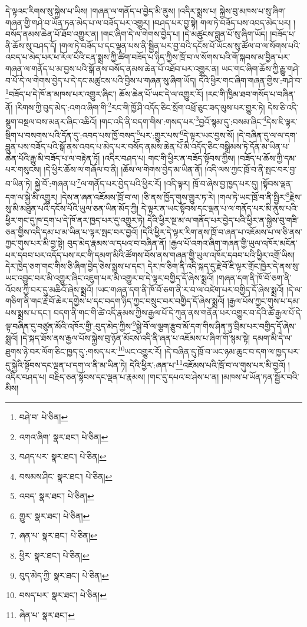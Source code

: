 དེ་ལྟའང་རིགས་སུ་སྐྱེས་པ་ཡིས། །གཞན་ལ་གནོད་པ་བྱེད་མི་ནུས། །འདིར་སྨྲས་པ། སྐྱེས་བུ་མཁས་པ་སུ་ཞིག་གཞན་གྱི་གཤེ་བ་ཡོན་ཏན་མེད་པ་ལ་བཟོད་པར་འགྱུར། །བཤད་པར་བྱ་སྟེ། གལ་ཏེ་བཟོད་པས་འབད་མེད་པར། །བསོད་ནམས་ཆེན་པོ་ཐོབ་འགྱུར་ན། །གང་ཞིག་དེ་ལ་གེགས་བྱེད་པ། །དེ་མཚུངས་བླུན་པོ་སུ་ཞིག་ཡོད། །བཟོད་པ་ནི་ཆོས་སུ་བཤད་དོ། །གལ་ཏེ་བཟོད་པ་དང་ལྡན་པས་ནི་སྦྱིན་པར་བྱ་བའི་དངོས་པོ་ཡོངས་སུ་ཚོལ་བ་ལ་སོགས་པའི་འབད་པ་མེད་པར་ཕ་རོལ་པོའི་ངན་སྨྲས་ཀྱི་ཚིག་བཟོད་པ་ཉིད་ཀྱིས་ཁྲོ་བ་ལ་སོགས་པའི་གོ་སྐབས་མ་བྱིན་པར་གཞན་ལ་གནོད་པ་མ་བྱས་པའི་སྒོ་ནས་བསོད་ནམས་ཆེན་པོ་འཐོབ་པར་འགྱུར་ན། ཡང་གང་ཞིག་ཆོས་ཀྱི་རྒྱུ་གཤེ་བ་པོ་དེ་ལ་གེགས་བྱེད་པ་དེ་དང་མཚུངས་པའི་བྱིས་པ་གཞན་སུ་ཞིག་ཡོད། དེའི་ཕྱིར་གང་ཞིག་གཞན་གྱིས་:གཤེ་བ་\footnote{བཤེ་བ་  པེ་ཅིན། }བཟོད་པ་དེ་ཁོ་ན་མཁས་པར་འགྱུར་ཞིང་། ཆོས་ཆེན་པོ་ཡང་དེ་ལ་འགྱུར་རོ། །རང་གི་ཁྱིམ་ཐབ་གསོད་པ་བཞིན་ནོ། །རིགས་ཀྱི་བུད་མེད་:འགའ་ཞིག་གི་\footnote{འགའ་ཞིག་  སྣར་ཐང་།  པེ་ཅིན། }རང་གི་ཁྱོ་ཤི་འདོད་ཅིང་སྲོག་འཕྲོ་ཅུང་ཟད་ལུས་པར་གྱུར་ཏེ། དེས་ཅི་འདི་སྡུག་བསྔལ་བས་མནར་ཞིང་འཆིའོ། །གང་འདི་ནི་བདག་གིས་:གསད་པར་\footnote{བཤད་པར་  སྣར་ཐང་།  པེ་ཅིན། }བྱའོ་སྙམ་དུ་:བསམ་ཞིང་\footnote{བསམས་ཤིང་  སྣར་ཐང་།  པེ་ཅིན། }དེས་ཇི་ལྟར་སྡིག་པ་བསགས་པའི་དོན་དུ་:འབད་པས་ཁྱོ་བསད་\footnote{འབད་  སྣར་ཐང་།  པེ་ཅིན། }པར་:གྱུར་པས་\footnote{གྱུར་  སྣར་ཐང་།  པེ་ཅིན། }དེ་ལྟར་ཡང་བྱས་སོ། །དེ་བཞིན་དུ་ལ་ལ་དག་བླུན་པས་བཟོད་པའི་སྒོ་ནས་འབད་པ་མེད་པར་བསོད་ནམས་ཆེན་པོ་མི་འདོད་ཅིང་བསྒྲིམས་ཏེ་དོན་མ་ཡིན་པ་ཆེན་པོའི་རྒྱུ་མི་བཟོད་པ་ལ་བརྟེན་ཏོ། །འདིར་བཤད་པ། གང་གི་ཕྱིར་ན་བཟོད་སྟོབས་ཀྱིས། །བཟོད་པ་ཆོས་ཀྱི་དམ་པར་གསུངས། །དེ་ཕྱིར་ཆོས་ལ་གཞོལ་བ་ནི། །ཆོས་ལ་གེགས་བྱེད་མ་ཡིན་ནོ། །འདི་ལས་ཀྱང་ཁྲོ་བ་ནི་སྤང་བར་བྱ་བ་ཡིན་ཏེ། སྐྱེ་བོ་:གཞན་པ་\footnote{ཞན་པ་  སྣར་ཐང་།  པེ་ཅིན། }ལ་གནོད་པར་བྱེད་པའི་ཕྱིར་རོ། །འདི་ལྟར། ཁྲོ་བ་ཞེས་བྱ་ཁྱད་པར་དུ། །སྟོབས་ལྡན་དག་ལ་སྐྱེ་མི་འགྱུར། །དེས་ན་ཞན་འཇོམས་ཁྲོ་བ་ལ། །ཅི་ནས་ཁྱོད་གུས་གྱུར་ཏ་རེ། །གལ་ཏེ་ཡང་ཁྲོ་བ་ནི་སྤྱིར་\footnote{ཕྱིར་  སྣར་ཐང་།  པེ་ཅིན། }རྗེས་སུ་མི་མཐུན་པའི་དངོས་པོའི་ཡུལ་ཅན་ཡིན་མོད་ཀྱི། དེ་ལྟར་ན་ཡང་སྟོབས་དང་ལྡན་པ་ལ་གནོད་པར་མི་ནུས་པའི་ཕྱིར་གང་དུ་ཁ་དྲག་པ་དེ་ཁོ་ནར་ཁྱད་པར་དུ་འགྱུར་ཏེ། དེའི་ཕྱིར་སྔ་མ་ལ་གནོད་པར་བྱེད་པའི་ཕྱིར་ན་སྐྱེས་བུ་གཟི་ཅན་གྱིས་འདི་དམ་པ་མ་ཡིན་པ་ལྟར་སྤང་བར་བྱའོ། །དེའི་ཕྱིར་དེ་ལྟར་རིག་ནས་ཁྲོ་བ་ཞན་པ་འཇོམས་པ་ལ་ཅི་ནས་ཀྱང་གུས་པར་མི་བྱ་སྟེ། བུད་མེད་རྣམས་ལ་དཔའ་བ་བཞིན་ནོ། །རྒྱལ་པོ་འགའ་ཞིག་གཞན་གྱི་ཡུལ་འཁོར་མངོན་པར་དབབ་པར་འདོད་པས་རང་གི་དམག་མིའི་ཚོགས་བོས་ནས་གཞན་གྱི་ཡུལ་འཁོར་དབབ་པའི་ཕྱིར་འགྲོ་ཡིས། དེར་ཁྱེད་ཅག་གང་གིས་ཅི་ཞིག་བྱེད་ཅེས་སྨྲས་པ་དང་། དེར་ཁ་ཅིག་ནི་འདི་སྐད་དུ་རྗེ་བོ་ཇི་ལྟར་གྲོང་ཁྱེར་དེ་ནས་སུ་ཡང་འབྱུང་བར་མི་འགྱུར་ཞིང་འཇུག་པར་མི་འགྱུར་བ་དེ་ལྟར་བགྱིད་དོ་ཞེས་སྨྲའོ། །གཞན་དག་ནི་ཁོ་བོ་ཅག་ནི་འོབས་ཀྱི་བར་དུ་མཆིའོ་ཞེས་སྨྲའོ། །ཡང་གཞན་དག་ནི་ཁོ་བོ་ཅག་ནི་ར་བ་ལ་འཛེག་པར་བགྱིད་དོ་ཞེས་སྨྲའོ། །དེ་ལ་གཅིག་ནི་གང་རྗེ་བོ་ཆེར་དགྱེས་པ་དང་བདག་ཉིད་ཀྱང་བསྲུང་བར་བགྱིད་དོ་ཞེས་སྨྲའོ། །རྒྱལ་པོས་ཀྱང་གུས་པ་དམ་པས་སྨྲས་པ་དང་། བདག་ནི་གང་གི་ཚེ་འདི་རྣམས་ཀྱིས་རྒྱལ་པོ་དེ་ཀུན་ནས་གནོན་པར་འགྱུར་བ་དེའི་ཚེ་རྒྱལ་པོ་དེ་ལྟ་བཞིན་དུ་བཙུན་མོའི་འཁོར་གྱི་:བུད་མེད་ཀྱིས་\footnote{བུད་མེད་ཀྱི་  སྣར་ཐང་།  པེ་ཅིན། }སྐྱེ་བོ་ལ་ལྕག་རྩུབ་མོ་དག་གིས་ཤིན་ཏུ་བྲིམ་པར་བགྱིད་དོ་ཞེས་སྨྲའོ། །དེ་སྐད་ཐོས་ནས་རྒྱལ་པོས་སྐྱེས་བུ་ཉོན་མོངས་འདི་ནི་ཞན་པ་འཇོམས་པ་ཞིག་གོ་སྙམ་སྟེ། དམག་མི་དེ་ལ་ཐུགས་ཉེ་བར་ལོག་ཅིང་ཁྱད་དུ་:གསད་པར་\footnote{བསད་པར་  སྣར་ཐང་།  པེ་ཅིན། }ཡང་འགྱུར་རོ། །དེ་བཞིན་དུ་ཁྲོ་བ་ཡང་ཉམ་ཆུང་བ་དག་ལ་ཁྱད་པར་དུ་སྐྱེའི་སྟོབས་དང་ལྡན་པ་དག་ལ་ནི་མ་ཡིན་ཏེ། དེའི་ཕྱིར་:ཞན་པ་\footnote{ཞེན་པ་  སྣར་ཐང་། }འཇོམས་པའི་ཁྲོ་བ་ལ་གུས་པར་མི་བྱའོ། །འདིར་བཤད་པ། བརྗིད་ཅན་སྟོབས་དང་ལྡན་པ་རྣམས། །གང་དུ་དཔའ་བ་ཤེས་པ་ན། །མཁས་པ་ཡོན་ཏན་སྦྱོར་བའི་མིས། 